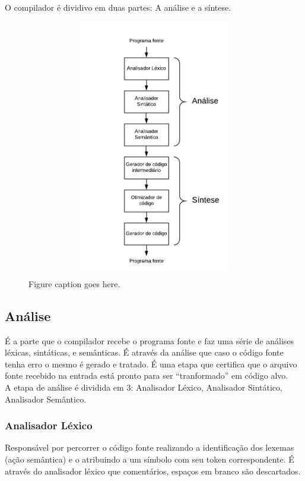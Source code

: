 O compilador é dividivo em duas partes: A análise e a síntese.

\begin{figure}
\includegraphics[width=337pt, height=320pt]{chapters/chapter1/figures/imagem6.png}
\caption[List of figure caption goes here]{Figure caption goes here.}
\end{figure}

\subsection{Análise}
É a parte que o compilador recebe o programa fonte e faz uma série de análises léxicas, sintáticas, e semânticas. É através da análise que caso o código fonte tenha erro o mesmo é gerado e tratado. É uma etapa que certifica que o arquivo fonte recebido na entrada está pronto para ser “tranformado” em código alvo.\\

A etapa de análise é dividida em 3: Analisador Léxico, Analisador Sintático, Analisador Semântico. \\

\subsubsection{Analisador Léxico}
Responsável por percorrer o código fonte realizando a identificação dos lexemas (ação semântica) e o atribuindo a um símbolo com seu token correspondente. É através do analisador léxico que comentários, espaços em branco são descartados. \\

